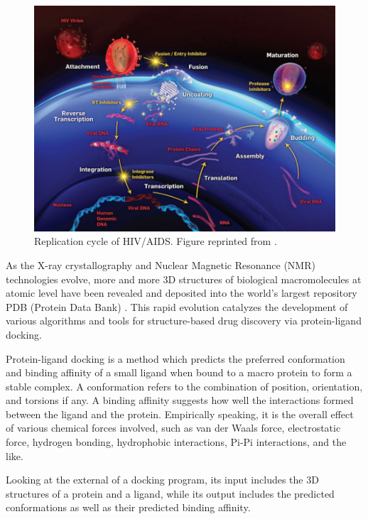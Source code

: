 \begin{figure}
\centering
\includegraphics[width=\textwidth]{Background/HIV.jpg}
\caption{Replication cycle of HIV/AIDS. Figure reprinted from \citep{296}.}
\label{fig:HIV}
\end{figure}



As the X-ray crystallography and Nuclear Magnetic Resonance (NMR) technologies evolve, more and more 3D structures of biological macromolecules at atomic level have been revealed and deposited into the world's largest repository PDB (Protein Data Bank) \citep{540,537}. This rapid evolution catalyzes the development of various algorithms and tools for structure-based drug discovery via protein-ligand docking.

Protein-ligand docking is a method which predicts the preferred conformation and binding affinity of a small ligand when bound to a macro protein to form a stable complex. A conformation refers to the combination of position, orientation, and torsions if any. A binding affinity suggests how well the interactions formed between the ligand and the protein. Empirically speaking, it is the overall effect of various chemical forces involved, such as van der Waals force, electrostatic force, hydrogen bonding, hydrophobic interactions, Pi-Pi interactions, and the like.

Looking at the external of a docking program, its input includes the 3D structures of a protein and a ligand, while its output includes the predicted conformations as well as their predicted binding affinity.

